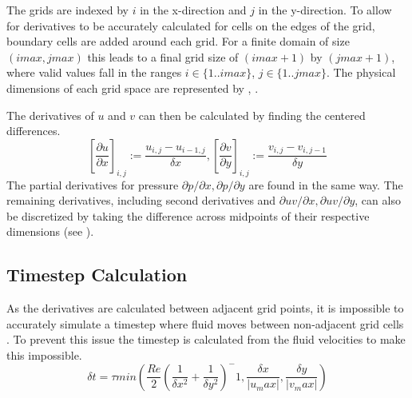 The grids are indexed by $i$ in the x-direction and $j$ in the y-direction.
To allow for derivatives to be accurately calculated for cells on the edges of the grid, boundary cells are added around each grid.
For a finite domain of size $(imax, jmax)$ this leads to a final grid size of $(imax + 1)$ by $(jmax + 1)$, where valid values fall in the ranges %
$i \in \{1..imax\}$, $j \in \{1..jmax\}$.
The physical dimensions of each grid space are represented by \deltaX{}, \deltaY{}.

The derivatives of $u$ and $v$ can then be calculated by finding the centered differences\todocite{}.
\begin{equation}
    \left[\frac{\partial{u}}{\partial{x}}\right]_{i,j} := \frac{u_{i,j}-u_{i-1,j}}{\delta{x}},%
    \left[\frac{\partial{v}}{\partial{y}}\right]_{i,j} := \frac{v_{i,j}-v_{i,j-1}}{\delta{y}}
\end{equation}
The partial derivatives for pressure $\partial{p}/\partial{x}, \partial{p}/\partial{y}$ are found in the same way.
The remaining derivatives, including second derivatives and $\partial{uv}/\partial{x}, \partial{uv}/\partial{y}$, can also be discretized by taking the difference across midpoints of their respective dimensions (see ).
%

\subsection{Timestep Calculation}
As the derivatives are calculated between adjacent grid points, it is impossible to accurately simulate a timestep where fluid moves between non-adjacent grid cells .%
To prevent this issue the timestep \deltaT{} is calculated from the fluid velocities to make this impossible.
\begin{equation}
    \delta{t} = \tau min\left(
        \frac{Re}{2}\left(
            \frac{1}{\delta{x}^2} + \frac{1}{\delta{y}^2}
        \right)^-1,
        \frac{\delta{x}}{|u_max|},
        \frac{\delta{y}}{|v_max|}
    \right)
\end{equation}

